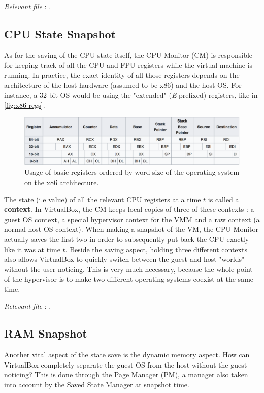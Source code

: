 \hfill\textit{Relevant file }: .

\subsection*{CPU State Snapshot}

As for the saving of the CPU state itself, the CPU Monitor (CM) is responsible for keeping track of all the CPU and \gls{FPU} registers while the virtual machine is running. In practice, the exact identity of all those registers depends on the architecture of the host hardware (assumed to be x86) and the host OS. For instance, a 32-bit OS would be using the "extended" (\textit{E}-prefixed) registers, like in \autoref{fig:x86-regs}. 
\begin{figure}[H]
	\centering
	\includegraphics[width=.85\linewidth,keepaspectratio]{art/x86-regs.png}
	\caption{Usage of basic registers ordered by word size of the operating system on the x86 architecture.}
	\label{fig:x86-regs}
\end{figure}
The state (i.e value) of all the relevant CPU registers at a time $t$ is called a \textbf{context}. In VirtualBox, the CM keeps local copies of three of these contexts : a guest OS context, a special hypervisor context for the VMM and a raw context (a normal host OS context). When making a snapshot of the VM, the CPU Monitor actually saves the first two in order to subsequently put back the CPU exactly like it was at time $t$. Beside the saving aspect, holding three different contexts also allows VirtualBox to quickly switch between the guest and host "worlds" without the user noticing. This is very much necessary, because the whole point of the hypervisor is to make two different operating systems coexist at the same time.

\hfill\textit{Relevant file }: .

\subsection*{RAM Snapshot}
Another vital aspect of the state save is the dynamic memory aspect. How can VirtualBox completely separate the guest OS from the host without the guest noticing? This is done through the Page Manager (PM), a manager also taken into account by the Saved State Manager at snapshot time. 

